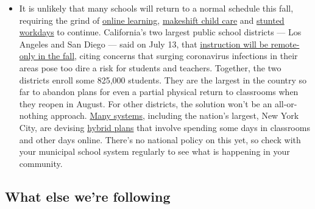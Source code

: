 \begin{itemize}
  \begin{itemize}
  \tightlist
  \item
    It is unlikely that many schools will return to a normal schedule
    this fall, requiring the grind of
    \href{https://www.nytimes3xbfgragh.onion/2020/06/05/us/coronavirus-education-lost-learning.html?action=click\&pgtype=Article\&state=default\&region=MAIN_CONTENT_3\&context=storylines_faq}{online
    learning},
    \href{https://www.nytimes3xbfgragh.onion/2020/05/29/us/coronavirus-child-care-centers.html?action=click\&pgtype=Article\&state=default\&region=MAIN_CONTENT_3\&context=storylines_faq}{makeshift
    child care} and
    \href{https://www.nytimes3xbfgragh.onion/2020/06/03/business/economy/coronavirus-working-women.html?action=click\&pgtype=Article\&state=default\&region=MAIN_CONTENT_3\&context=storylines_faq}{stunted
    workdays} to continue. California's two largest public school
    districts --- Los Angeles and San Diego --- said on July 13, that
    \href{https://www.nytimes3xbfgragh.onion/2020/07/13/us/lausd-san-diego-school-reopening.html?action=click\&pgtype=Article\&state=default\&region=MAIN_CONTENT_3\&context=storylines_faq}{instruction
    will be remote-only in the fall}, citing concerns that surging
    coronavirus infections in their areas pose too dire a risk for
    students and teachers. Together, the two districts enroll some
    825,000 students. They are the largest in the country so far to
    abandon plans for even a partial physical return to classrooms when
    they reopen in August. For other districts, the solution won't be an
    all-or-nothing approach.
    \href{https://bioethics.jhu.edu/research-and-outreach/projects/eschool-initiative/school-policy-tracker/}{Many
    systems}, including the nation's largest, New York City, are
    devising
    \href{https://www.nytimes3xbfgragh.onion/2020/06/26/us/coronavirus-schools-reopen-fall.html?action=click\&pgtype=Article\&state=default\&region=MAIN_CONTENT_3\&context=storylines_faq}{hybrid
    plans} that involve spending some days in classrooms and other days
    online. There's no national policy on this yet, so check with your
    municipal school system regularly to see what is happening in your
    community.
  \end{itemize}
\end{itemize}

\hypertarget{what-else-were-following}{%
\subsection{What else we're following}\label{what-else-were-following}}

